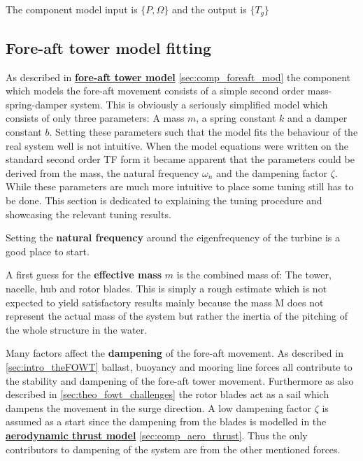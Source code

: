 The component model input is $ \{P, \Omega\} $ and the output is $ \{T_g\} $



\subsection{Fore-aft tower model fitting} \label{sec:app_mod_foreaft_fitting}
As described in \hyperref[sec:comp_foreaft_mod]{\textbf{fore-aft tower model}} \cref{sec:comp_foreaft_mod} the component which models the fore-aft movement consists of a simple second order mass-spring-damper system. This is obviously a seriously simplified model which consists of only three parameters: A mass $ m $, a spring constant $ k $ and a damper constant $ b $. Setting these parameters such that the model fits the behaviour of the real system well is not intuitive. When the model equations were written on the standard second order TF form it became apparent that the parameters could be derived from the mass, the natural frequency $ \omega_n $ and the dampening factor $ \zeta $. While these parameters are much more intuitive to place some tuning still has to be done. This section is dedicated to explaining the tuning procedure and showcasing the relevant tuning results.

\medskip
\noindent Setting the \textbf{natural frequency} around the eigenfrequency of the turbine is a good place to start.

\smallskip
\noindent A first guess for the \textbf{effective mass} $ m $ is the combined mass of: The tower, nacelle, hub and rotor blades. This is simply a rough estimate which is not expected to yield satisfactory results mainly because the mass M does not represent the actual mass of the system but rather the inertia of the pitching of the whole structure in the water. 

\smallskip
\noindent Many factors affect the \textbf{dampening} of the fore-aft movement. As described in \cref{sec:intro_theFOWT} ballast, buoyancy and mooring line forces all contribute to the stability and dampening of the fore-aft tower movement. Furthermore as also described in \cref{sec:theo_fowt_challenges} the rotor blades act as a sail which dampens the movement in the surge direction. A low dampening factor $ \zeta $ is assumed as a start since the dampening from the blades is modelled in the \hyperref[sec:comp_aero_thrust]{\textbf{aerodynamic thrust model}} \cref{sec:comp_aero_thrust}. Thus the only contributors to dampening of the system are from the other mentioned forces.

